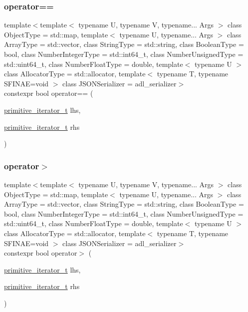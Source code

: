 \subsubsection{\texorpdfstring{operator==}{operator==}}
{\footnotesize\ttfamily template$<$template$<$ typename U, typename V, typename... Args $>$ class Object\+Type = std\+::map, template$<$ typename U, typename... Args $>$ class Array\+Type = std\+::vector, class String\+Type  = std\+::string, class Boolean\+Type  = bool, class Number\+Integer\+Type  = std\+::int64\+\_\+t, class Number\+Unsigned\+Type  = std\+::uint64\+\_\+t, class Number\+Float\+Type  = double, template$<$ typename U $>$ class Allocator\+Type = std\+::allocator, template$<$ typename T, typename S\+F\+I\+N\+A\+E=void $>$ class J\+S\+O\+N\+Serializer = adl\+\_\+serializer$>$ \\
constexpr bool operator== (\begin{DoxyParamCaption}\item[{\hyperlink{classnlohmann_1_1basic__json_1_1primitive__iterator__t}{primitive\+\_\+iterator\+\_\+t}}]{lhs,  }\item[{\hyperlink{classnlohmann_1_1basic__json_1_1primitive__iterator__t}{primitive\+\_\+iterator\+\_\+t}}]{rhs }\end{DoxyParamCaption})\hspace{0.3cm}{\ttfamily [friend]}}

\mbox{\label{classnlohmann_1_1basic__json_1_1primitive__iterator__t_a680c471188e46854d7b78a7c2a0c1122}} 
\subsubsection{\texorpdfstring{operator$>$}{operator>}}
{\footnotesize\ttfamily template$<$template$<$ typename U, typename V, typename... Args $>$ class Object\+Type = std\+::map, template$<$ typename U, typename... Args $>$ class Array\+Type = std\+::vector, class String\+Type  = std\+::string, class Boolean\+Type  = bool, class Number\+Integer\+Type  = std\+::int64\+\_\+t, class Number\+Unsigned\+Type  = std\+::uint64\+\_\+t, class Number\+Float\+Type  = double, template$<$ typename U $>$ class Allocator\+Type = std\+::allocator, template$<$ typename T, typename S\+F\+I\+N\+A\+E=void $>$ class J\+S\+O\+N\+Serializer = adl\+\_\+serializer$>$ \\
constexpr bool operator$>$ (\begin{DoxyParamCaption}\item[{\hyperlink{classnlohmann_1_1basic__json_1_1primitive__iterator__t}{primitive\+\_\+iterator\+\_\+t}}]{lhs,  }\item[{\hyperlink{classnlohmann_1_1basic__json_1_1primitive__iterator__t}{primitive\+\_\+iterator\+\_\+t}}]{rhs }\end{DoxyParamCaption})\hspace{0.3cm}{\ttfamily [friend]}}

